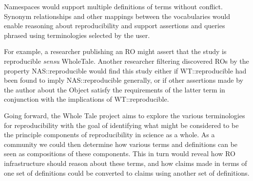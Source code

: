 Namespaces would support multiple definitions of terms without conflict.
Synonym relationships and other mappings between the vocabularies would enable reasoning about reproducibility
	 and support assertions and queries phrased using terminologies selected by the user.

         For example, a researcher publishing an RO might assert that the study is reproducible \emph{sensu} \textsf{WholeTale}.  Another researcher filtering discovered ROs by the property \textsf{NAS::reproducible} would find this study
         either if \textsf{WT::reproducible} had been found to imply \textsf{NAS::reproducible} generally, or if other assertions made by the author
         about the Object satisfy the requirements of the latter term in conjunction with the implications of \textsf{WT::reproducible}.

         Going forward, the Whole Tale project aims to explore the various terminologies for reproducibility with the goal of identifying what might be considered to be the principle components of reproducibility in science as a whole.  As a community we could then determine how various terms and definitions can be seen as compositions of these components.  This in turn would reveal how RO infrastructure should reason about these terms, and how claims made in terms of one set of definitions could be converted to claims using another set of definitions.




